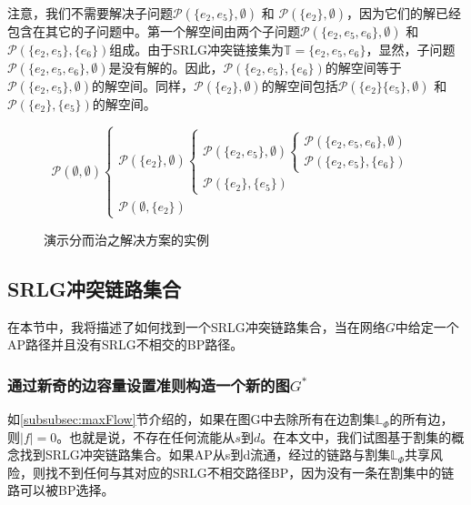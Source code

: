 注意，我们不需要解决子问题${{\mathcal{P}}(\{ e_2,e_5\}, \emptyset)}$ 和 ${{\mathcal{P}}(\{ e_2\},\emptyset )}$，因为它们的解已经包含在其它的子问题中。第一个解空间由两个子问题${{\mathcal P}(\{ e_2,e_5,e_6\} ,\emptyset )}$ 和 ${{\mathcal P}(\{ e_2,e_5\} ,\{ e_6\} )}$组成。由于SRLG冲突链接集为$\mathbb{T}=\{e_2,e_5,e_6\}$，显然，子问题${{\mathcal P}(\{ e_2,e_5,e_6\} ,\emptyset )}$是没有解的。因此，${{\mathcal P}(\{ e_2,e_5\} ,\{ e_6\} )}$的解空间等于${{\mathcal{P}}(\{ e_2, e_5\}, \emptyset)}$的解空间。同样，${{\mathcal{P}}(\{ e_2\},\emptyset )}$的解空间包括${{\mathcal{P}}(\{ e_2\} \{ e_5\}, \emptyset)}$  和 ${{\mathcal{P}}(\{ e_2\} ,\{ e_5\} )}$的解空间。
\begin{figure}[htbp]
\large{
\begin{equation*}
{\mathcal P}(\emptyset ,\emptyset )\left\{ {\begin{array}{*{20}{l}}
{{\mathcal P}(\{ e_2\} ,\emptyset )\left\{ {\begin{array}{*{20}{l}}
{{\mathcal P}(\{ e_2,e_5\} ,\emptyset )\left\{ {\begin{array}{*{20}{l}}
{{\mathcal P}(\{ e_2,e_5,e_6\} ,\emptyset )}\\
{\boxed{{\mathcal P}(\{ e_2,e_5\} ,\{ e_6\} )}}
\end{array}} \right.}\\
{\boxed{{\mathcal P}(\{ e_2\} ,\{ e_5\} )}}
\end{array}} \right.}\\
{\boxed{{\mathcal P}(\emptyset ,\{ e_2\} )}}
\end{array}} \right.
\end{equation*}
}
\caption{演示分而治之解决方案的实例}
\label{fig:DividedConquer}
\end{figure}




\subsection{SRLG冲突链路集合}
在本节中，我将描述了如何找到一个SRLG冲突链路集合，当在网络$G$中给定一个AP路径并且没有SRLG不相交的BP路径。
\subsubsection{通过新奇的边容量设置准则构造一个新的图$G^*$}
如\ref{subsubsec:maxFlow}节介绍的，如果在图G中去除所有在边割集$\mathbb{\mathbb{L}}_{\Phi}$的所有边，则$|f| = 0$。也就是说，不存在任何流能从$s$到$d$。在本文中，我们试图基于割集的概念找到SRLG冲突链路集合。如果AP从s到d流通，经过的链路与割集$\mathbb{\mathbb{L}}_{\Phi}$共享风险，则找不到任何与其对应的SRLG不相交路径BP，因为没有一条在割集中的链路可以被BP选择。

